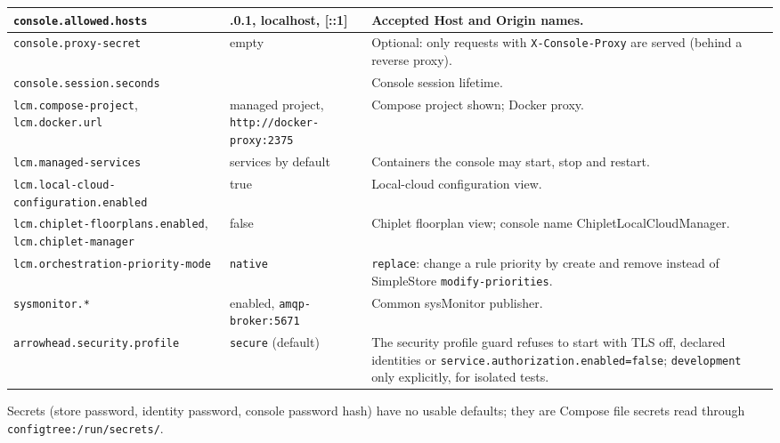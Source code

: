 \documentclass[a4paper]{arrowhead}
\begin{document}
\begin{longtable}{| >{\raggedright\arraybackslash}p{5.2cm} | >{\raggedright\arraybackslash}p{3.6cm} | >{\raggedright\arraybackslash}p{6.0cm} |}
\texttt{console.\allowbreak{}allowed.\allowbreak{}hosts} & 127.0.0.1, localhost, [::1] & Accepted Host and Origin names. \\ \hline
\texttt{console.\allowbreak{}proxy-\allowbreak{}secret} & empty & Optional: only requests with \texttt{X-\allowbreak{}Console-\allowbreak{}Proxy} are served (behind a reverse proxy). \\ \hline
\texttt{console.\allowbreak{}session.\allowbreak{}seconds} & 28800 & Console session lifetime. \\ \hline
\texttt{lcm.\allowbreak{}compose-\allowbreak{}project}, \texttt{lcm.\allowbreak{}docker.\allowbreak{}url} & managed project, \texttt{http:\allowbreak{}/\allowbreak{}/\allowbreak{}docker-\allowbreak{}proxy:\allowbreak{}2375} & Compose project shown; Docker proxy. \\ \hline
\texttt{lcm.\allowbreak{}managed-\allowbreak{}services} & 23 services by default & Containers the console may start, stop and restart. \\ \hline
\texttt{lcm.\allowbreak{}local-\allowbreak{}cloud-\allowbreak{}configuration.\allowbreak{}enabled} & true & Local-cloud configuration view. \\ \hline
\texttt{lcm.\allowbreak{}chiplet-\allowbreak{}floorplans.\allowbreak{}enabled}, \texttt{lcm.\allowbreak{}chiplet-\allowbreak{}manager} & false & Chiplet floorplan view; console name ChipletLocalCloudManager. \\ \hline
\texttt{lcm.\allowbreak{}orchestration-\allowbreak{}priority-\allowbreak{}mode} & \texttt{native} & \texttt{replace}: change a rule priority by create and remove instead of SimpleStore \texttt{modify-\allowbreak{}priorities}. \\ \hline
\texttt{sysmonitor.\allowbreak{}*} & enabled, \texttt{amqp-\allowbreak{}broker:\allowbreak{}5671} & Common sysMonitor publisher. \\ \hline
\texttt{arrowhead.\allowbreak{}security.\allowbreak{}profile} & \texttt{secure} (default) & The security profile guard refuses to start with TLS off, declared identities or \texttt{service.\allowbreak{}authorization.\allowbreak{}enabled=\allowbreak{}false}; \texttt{development} only explicitly, for isolated tests. \\ \hline
\end{longtable}

Secrets (store password, identity password, console password hash) have no usable defaults; they are Compose file secrets read through \texttt{configtree:\allowbreak{}/\allowbreak{}run/\allowbreak{}secrets/}.
\end{document}
